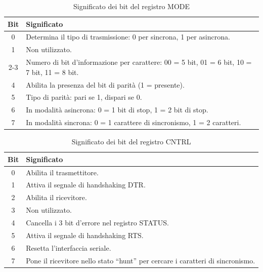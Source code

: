 \begin{table}[h]
    \centering
    \begin{tabular}{|c|p{11cm}|}
    \hline
    \textbf{Bit} & \textbf{Significato} \\
    \hline
    0 & Determina il tipo di trasmissione: 0 per sincrona, 1 per asincrona. \\
    1 & Non utilizzato. \\
    2-3 & Numero di bit d'informazione per carattere: 00 = 5 bit, 01 = 6 bit, 10 = 7 bit, 11 = 8 bit. \\
    4 & Abilita la presenza del bit di parità (1 = presente). \\
    5 & Tipo di parità: pari se 1, dispari se 0. \\
    6 & In modalità asincrona: 0 = 1 bit di stop, 1 = 2 bit di stop. \\
    7 & In modalità sincrona: 0 = 1 carattere di sincronismo, 1 = 2 caratteri. \\
    \hline
    \end{tabular}
    \caption{Significato dei bit del registro MODE}\label{tab:MODE-8251}
\end{table}
    
\begin{table}[h]
    \centering
    \begin{tabular}{|c|p{11cm}|}
    \hline
    \textbf{Bit} & \textbf{Significato} \\
    \hline
    0 & Abilita il trasmettitore. \\
    1 & Attiva il segnale di handshaking DTR. \\
    2 & Abilita il ricevitore. \\
    3 & Non utilizzato. \\
    4 & Cancella i 3 bit d'errore nel registro STATUS. \\
    5 & Attiva il segnale di handshaking RTS. \\
    6 & Resetta l'interfaccia seriale. \\
    7 & Pone il ricevitore nello stato ``hunt'' per cercare i caratteri di sincronismo. \\
    \hline
    \end{tabular}
    \caption{Significato dei bit del registro CNTRL}\label{tab:CNTRL-8251}
\end{table}

